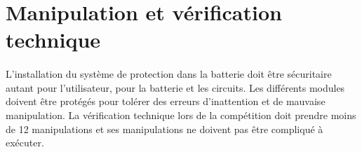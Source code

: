 \section{Manipulation et vérification technique}
\paragraph*{}
L'installation du système de protection dans la batterie doit être sécuritaire autant pour l'utilisateur, pour la batterie et les circuits. Les différents modules doivent être protégés pour tolérer des erreurs d'inattention et de mauvaise manipulation. La vérification technique lors de la compétition doit prendre moins de 12 manipulations et ses manipulations ne doivent pas être compliqué à exécuter.